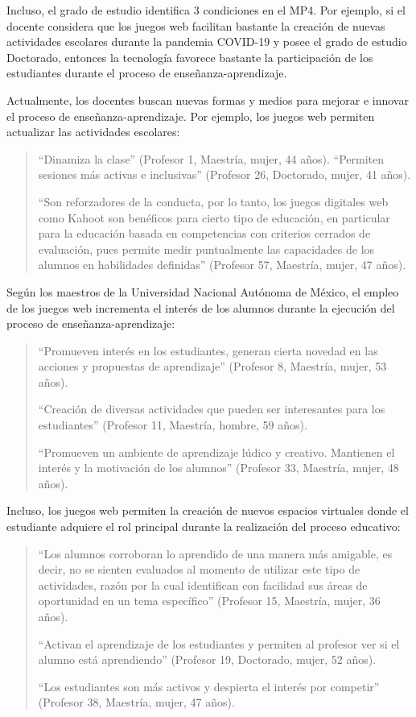 \documentclass[spanish]{textolivre}
\begin{document}
Incluso, el grado de estudio identifica 3 condiciones en el MP4. Por ejemplo, si el docente considera que los juegos web facilitan bastante la creación de nuevas actividades escolares durante la pandemia COVID-19 y posee el grado de estudio Doctorado, entonces la tecnología favorece bastante la participación de los estudiantes durante el proceso de enseñanza-aprendizaje.

Actualmente, los docentes buscan nuevas formas y medios para mejorar e innovar el proceso de enseñanza-aprendizaje. Por ejemplo, los juegos web permiten actualizar las actividades escolares:

\begin{quote}
“Dinamiza la clase” (Profesor 1, Maestría, mujer, 44 años).
“Permiten sesiones más activas e inclusivas” (Profesor 26, Doctorado, mujer, 41 años).

“Son reforzadores de la conducta, por lo tanto, los juegos digitales web como Kahoot son benéficos para cierto tipo de educación, en particular para la educación basada en competencias con criterios cerrados de evaluación, pues permite medir puntualmente las capacidades de los alumnos en habilidades definidas” (Profesor 57, Maestría, mujer, 47 años).
\end{quote}

Según los maestros de la Universidad Nacional Autónoma de México, el empleo de los juegos web incrementa el interés de los alumnos durante la ejecución del proceso de enseñanza-aprendizaje:

\begin{quote}
“Promueven interés en los estudiantes, generan cierta novedad en las acciones y propuestas de aprendizaje” (Profesor 8, Maestría, mujer, 53 años).

“Creación de diversas actividades que pueden ser interesantes para los estudiantes” (Profesor 11, Maestría, hombre, 59 años).

“Promueven un ambiente de aprendizaje lúdico y creativo. Mantienen el interés y la motivación de los alumnos” (Profesor 33, Maestría, mujer, 48 años).
\end{quote}

Incluso, los juegos web permiten la creación de nuevos espacios virtuales donde el estudiante adquiere el rol principal durante la realización del proceso educativo:

\begin{quote}
“Los alumnos corroboran lo aprendido de una manera más amigable, es decir, no se sienten evaluados al momento de utilizar este tipo de actividades, razón por la cual identifican con facilidad sus áreas de oportunidad en un tema específico” (Profesor 15, Maestría, mujer, 36 años).

“Activan el aprendizaje de los estudiantes y permiten al profesor ver si el alumno está aprendiendo” (Profesor 19, Doctorado, mujer, 52 años).

“Los estudiantes son más activos y despierta el interés por competir” (Profesor 38, Maestría, mujer, 47 años).
\end{quote}
\end{document}
